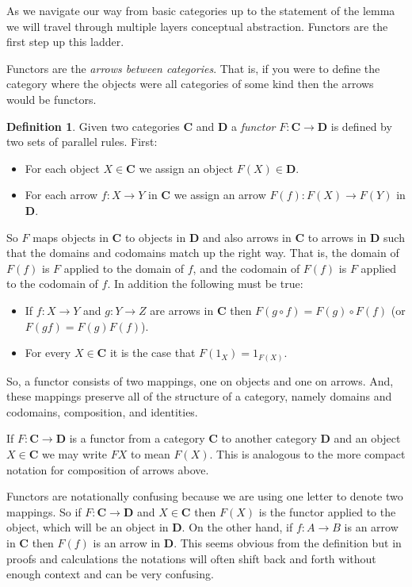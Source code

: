 \documentclass[12pt]{article}
\theoremstyle{definition}
\theoremstyle{definition}
\newtheorem{defn}{Definition}[]
\theoremstyle{definition}
\numberwithin{equation}{section}
\newcommand{\cat}[1]{\mathbf{#1}}      %
\newcommand{\CC}{\cat{C}}
\newcommand{\DD}{\cat{D}}
\def\ni{\goodbreak\noindent}
\begin{document}
As we navigate our way from basic categories up to the statement of the lemma we will
travel through multiple layers conceptual abstraction. Functors are the first step up this
ladder.

Functors are the {\it arrows between categories}. That is, if you were to define the
category where the objects were all categories of some kind then the arrows would be
functors.

\goodbreak
\begin{defn}
Given two categories $\CC$ and $\DD$ a {\it functor} $F : \CC \to \DD$ is defined by two
sets of parallel rules. First:
\begin{itemize}
\item For each object $X \in \CC$ we assign an object $F(X) \in \DD$.
\item For each arrow $f: X \to Y$ in $\CC$ we assign an arrow $F(f): F(X) \to F(Y)$ in
$\DD$.
\end{itemize}
\ni
So $F$ maps objects in $\CC$ to objects in $\DD$ and also arrows in $\CC$ to arrows in
$\DD$ such that the domains and codomains match up the right way. That is, the domain of
$F(f)$ is $F$ applied to the domain of $f$, and the codomain of $F(f)$ is $F$ applied to
the codomain of $f$. In addition the following must be true:
\begin{itemize}
\item If $f:X \to Y$ and $g: Y \to Z$ are arrows in $\CC$ then $F(g \circ f) = F(g) \circ
F(f)$ (or $F(gf) = F(g)F(f)$).
\item For every $X \in \CC$ it is the case that $F(1_X) = 1_{F(X)}$.
\end{itemize}

\end{defn}
\ni
So, a functor consists of two mappings, one on objects and one on arrows. And, these
mappings preserve all of the structure of a category, namely domains and codomains,
composition, and identities.

If $F: \CC \to \DD$ is a functor from a category $\CC$ to another category $\DD$ and an
object $X \in \CC$ we may write $F X$ to mean $F(X)$. This is analogous to the more
compact notation for composition of arrows above.

Functors are notationally confusing because we are using one letter to denote two
mappings. So if $F: \CC \to \DD$ and $X \in \CC$ then $F(X)$ is the functor applied to the
object, which will be an object in $\DD$. On the other hand, if $f : A \to B$ is an arrow
in $\CC$ then $F(f)$ is an arrow in $\DD$. This seems obvious from the definition but in
proofs and calculations the notations will often shift back and forth without enough
context and can be very confusing.
\end{document}
